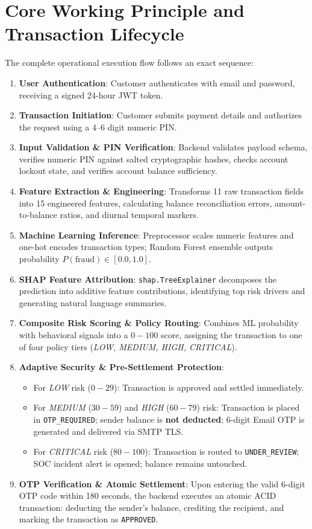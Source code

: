 \section{Core Working Principle and Transaction Lifecycle}
The complete operational execution flow follows an exact sequence:
\begin{enumerate}[label=\arabic*.]
    \item \textbf{User Authentication}: Customer authenticates with email and password, receiving a signed 24-hour JWT token.
    \item \textbf{Transaction Initiation}: Customer submits payment details and authorizes the request using a 4--6 digit numeric PIN.
    \item \textbf{Input Validation \& PIN Verification}: Backend validates payload schema, verifies numeric PIN against salted cryptographic hashes, checks account lockout state, and verifies account balance sufficiency.
    \item \textbf{Feature Extraction \& Engineering}: Transforms 11 raw transaction fields into 15 engineered features, calculating balance reconciliation errors, amount-to-balance ratios, and diurnal temporal markers.
    \item \textbf{Machine Learning Inference}: Preprocessor scales numeric features and one-hot encodes transaction types; Random Forest ensemble outputs probability $P(\text{fraud}) \in [0.0, 1.0]$.
    \item \textbf{SHAP Feature Attribution}: \texttt{shap.TreeExplainer} decomposes the prediction into additive feature contributions, identifying top risk drivers and generating natural language summaries.
    \item \textbf{Composite Risk Scoring \& Policy Routing}: Combines ML probability with behavioral signals into a $0-100$ score, assigning the transaction to one of four policy tiers (\textit{LOW, MEDIUM, HIGH, CRITICAL}).
    \item \textbf{Adaptive Security \& Pre-Settlement Protection}:
    \begin{itemize}
        \item For \textit{LOW} risk ($0-29$): Transaction is approved and settled immediately.
        \item For \textit{MEDIUM} ($30-59$) and \textit{HIGH} ($60-79$) risk: Transaction is placed in \texttt{OTP\_REQUIRED}; sender balance is \textbf{not deducted}; 6-digit Email OTP is generated and delivered via SMTP TLS.
        \item For \textit{CRITICAL} risk ($80-100$): Transaction is routed to \texttt{UNDER\_REVIEW}; SOC incident alert is opened; balance remains untouched.
    \end{itemize}
    \item \textbf{OTP Verification \& Atomic Settlement}: Upon entering the valid 6-digit OTP code within 180 seconds, the backend executes an atomic ACID transaction: deducting the sender's balance, crediting the recipient, and marking the transaction as \texttt{APPROVED}.
\end{enumerate}

